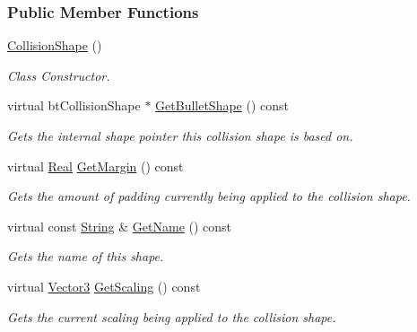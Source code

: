 \subsubsection*{Public Member Functions}
\begin{DoxyCompactItemize}
\item 
\hypertarget{classMezzanine_1_1CollisionShape_a0af2c4dbb24ad4fda4698b81799b65e2}{
\hyperlink{classMezzanine_1_1CollisionShape_a0af2c4dbb24ad4fda4698b81799b65e2}{CollisionShape} ()}
\label{classMezzanine_1_1CollisionShape_a0af2c4dbb24ad4fda4698b81799b65e2}

\begin{DoxyCompactList}\small\item\em Class Constructor. \item\end{DoxyCompactList}\item 
virtual btCollisionShape $\ast$ \hyperlink{classMezzanine_1_1CollisionShape_a0a5d6eb69c26665051ebb2b9d8004802}{GetBulletShape} () const 
\begin{DoxyCompactList}\small\item\em Gets the internal shape pointer this collision shape is based on. \item\end{DoxyCompactList}\item 
virtual \hyperlink{namespaceMezzanine_a726731b1a7df72bf3583e4a97282c6f6}{Real} \hyperlink{classMezzanine_1_1CollisionShape_a7f9d28c4c5ce7ab5a78af217d314fcaa}{GetMargin} () const 
\begin{DoxyCompactList}\small\item\em Gets the amount of padding currently being applied to the collision shape. \item\end{DoxyCompactList}\item 
virtual const \hyperlink{namespaceMezzanine_acf9fcc130e6ebf08e3d8491aebcf1c86}{String} \& \hyperlink{classMezzanine_1_1CollisionShape_af3f50f7ee9cb2d25c88daf0c92facb31}{GetName} () const 
\begin{DoxyCompactList}\small\item\em Gets the name of this shape. \item\end{DoxyCompactList}\item 
virtual \hyperlink{classMezzanine_1_1Vector3}{Vector3} \hyperlink{classMezzanine_1_1CollisionShape_ac05c6969066a1ab14c45aa566da701b6}{GetScaling} () const 
\begin{DoxyCompactList}\small\item\em Gets the current scaling being applied to the collision shape. \item\end{DoxyCompactList}\item 

\end{DoxyCompactItemize}

